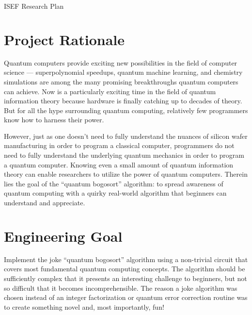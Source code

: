 \documentclass[12pt]{article}
\begin{document}
\pagestyle{fancy}
\fancyhead[R]{}

\centering \null
\vspace{2em}
\Huge ISEF Research Plan \\
\vspace{2em}
\raggedright \normalsize

\section{Project Rationale}
Quantum computers provide exciting new possibilities in the field of computer science --- superpolynomial speedups, quantum machine learning, and chemistry simulations are among the many promising breakthroughs quantum computers can achieve. Now is a particularly exciting time in the field of quantum information theory because hardware is finally catching up to decades of theory.
But for all the hype surrounding quantum computing, relatively few programmers know how to harness their power. \par%

However, just as one doesn't need to fully understand the nuances of silicon wafer manufacturing in order to program a classical computer, programmers do not need to fully understand the underlying quantum mechanics in order to program a quantum computer. Knowing even a small amount of quantum information theory can enable researchers to utilize the power of quantum computers. Therein lies the goal of the ``quantum bogosort'' algorithm: to spread awareness of quantum computing with a quirky real-world algorithm that beginners can understand and appreciate.



\section{Engineering Goal}
Implement the joke ``quantum bogosort'' algorithm using a non-trivial circuit that covers most fundamental quantum computing concepts. The algorithm should be sufficiently complex that it presents an interesting challenge to beginners, but not so difficult that it becomes incomprehensible. The reason a joke algorithm was chosen instead of an integer factorization or quantum error correction routine was to create something novel and, most importantly, fun! \par
\end{document}

